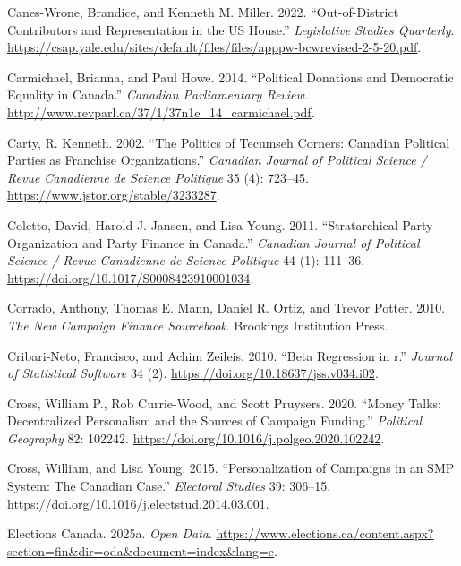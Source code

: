 \documentclass[
  letterpaper,
  DIV=11,
  numbers=noendperiod]{scrartcl}
\newlength{\cslhangindent}
\newenvironment{CSLReferences}[2] %
 {\begin{list}{}{%
  \setlength{\itemindent}{0pt}
  \setlength{\leftmargin}{0pt}
  \setlength{\parsep}{0pt}
  \ifodd #1
   \setlength{\leftmargin}{\cslhangindent}
   \setlength{\itemindent}{-1\cslhangindent}
  \fi
  \setlength{\itemsep}{#2\baselineskip}}}
 {\end{list}}
\begin{document}
\begin{CSLReferences}{1}{1}
Canes-Wrone, Brandice, and Kenneth M. Miller. 2022. {``Out-of-{District}
{Contributors} and {Representation} in the {US} {House}.''}
\emph{Legislative Studies Quarterly}.
\url{https://csap.yale.edu/sites/default/files/files/apppw-bcwrevised-2-5-20.pdf}.

Carmichael, Brianna, and Paul Howe. 2014. {``Political {Donations} and
{Democratic} {Equality} in {Canada}.''} \emph{Canadian Parliamentary
Review}. \url{http://www.revparl.ca/37/1/37n1e_14_carmichael.pdf}.

Carty, R. Kenneth. 2002. {``The {Politics} of {Tecumseh} {Corners}:
{Canadian} {Political} {Parties} as {Franchise} {Organizations}.''}
\emph{Canadian Journal of Political Science / Revue Canadienne de
Science Politique} 35 (4): 723--45.
\url{https://www.jstor.org/stable/3233287}.

Coletto, David, Harold J. Jansen, and Lisa Young. 2011. {``Stratarchical
Party Organization and Party Finance in Canada.''} \emph{Canadian
Journal of Political Science / Revue Canadienne de Science Politique} 44
(1): 111--36. \url{https://doi.org/10.1017/S0008423910001034}.

Corrado, Anthony, Thomas E. Mann, Daniel R. Ortiz, and Trevor Potter.
2010. \emph{The New Campaign Finance Sourcebook}. Brookings Institution
Press.

Cribari-Neto, Francisco, and Achim Zeileis. 2010. {``Beta Regression in
r.''} \emph{Journal of Statistical Software} 34 (2).
\url{https://doi.org/10.18637/jss.v034.i02}.

Cross, William P., Rob Currie-Wood, and Scott Pruysers. 2020. {``Money
Talks: Decentralized Personalism and the Sources of Campaign Funding.''}
\emph{Political Geography} 82: 102242.
\url{https://doi.org/10.1016/j.polgeo.2020.102242}.

Cross, William, and Lisa Young. 2015. {``Personalization of Campaigns in
an SMP System: The Canadian Case.''} \emph{Electoral Studies} 39:
306--15. \url{https://doi.org/10.1016/j.electstud.2014.03.001}.

Elections Canada. 2025a. \emph{Open {Data}}.
\url{https://www.elections.ca/content.aspx?section=fin&dir=oda&document=index&lang=e}.


\end{CSLReferences}
\end{document}
